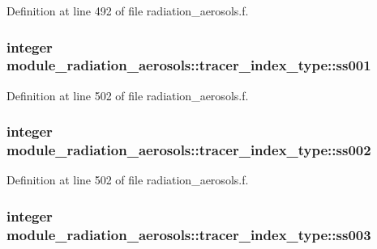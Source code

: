 Definition at line 492 of file radiation\+\_\+aerosols.\+f.

\subsubsection[{\texorpdfstring{ss001}{ss001}}]{\setlength{\rightskip}{0pt plus 5cm}integer module\+\_\+radiation\+\_\+aerosols\+::tracer\+\_\+index\+\_\+type\+::ss001\hspace{0.3cm}{\ttfamily [private]}}\hypertarget{group__module__radiation__aerosols_gacce0ecff4d4e84dffc0c23965053ac36}{}\label{group__module__radiation__aerosols_gacce0ecff4d4e84dffc0c23965053ac36}


Definition at line 502 of file radiation\+\_\+aerosols.\+f.

\subsubsection[{\texorpdfstring{ss002}{ss002}}]{\setlength{\rightskip}{0pt plus 5cm}integer module\+\_\+radiation\+\_\+aerosols\+::tracer\+\_\+index\+\_\+type\+::ss002\hspace{0.3cm}{\ttfamily [private]}}\hypertarget{group__module__radiation__aerosols_ga9e96ed67b1e072d97314bc9e6e09eee7}{}\label{group__module__radiation__aerosols_ga9e96ed67b1e072d97314bc9e6e09eee7}


Definition at line 502 of file radiation\+\_\+aerosols.\+f.

\subsubsection[{\texorpdfstring{ss003}{ss003}}]{\setlength{\rightskip}{0pt plus 5cm}integer module\+\_\+radiation\+\_\+aerosols\+::tracer\+\_\+index\+\_\+type\+::ss003\hspace{0.3cm}{\ttfamily [private]}}\hypertarget{group__module__radiation__aerosols_ga5aef8974607bb85ae1a23598a402adfb}{}\label{group__module__radiation__aerosols_ga5aef8974607bb85ae1a23598a402adfb}


